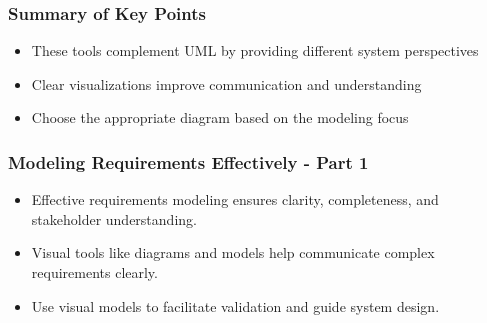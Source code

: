 \documentclass{beamer}
\begin{document}
\begin{frame}[fragile]
    \frametitle{Summary of Key Points}
    \begin{itemize}
        \item These tools complement UML by providing different system perspectives
        \item Clear visualizations improve communication and understanding
        \item Choose the appropriate diagram based on the modeling focus
    \end{itemize}
\end{frame}

\begin{frame}[fragile]
    \frametitle{Modeling Requirements Effectively - Part 1}
    \begin{itemize}
        \item Effective requirements modeling ensures clarity, completeness, and stakeholder understanding.
        \item Visual tools like diagrams and models help communicate complex requirements clearly.
        \item Use visual models to facilitate validation and guide system design.
    \end{itemize}
\end{frame}
\end{document}
